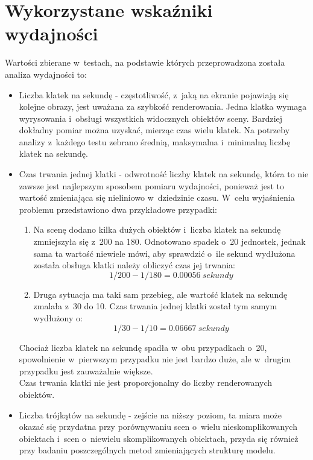 \documentclass[a4paper,twoside,12pt]{book}
\begin{document}
\section{Wykorzystane wskaźniki wydajności}
\label{section:benchamarks}
Wartości zbierane w~testach, na podstawie których przeprowadzona została analiza wydajności to:
\begin{itemize}
    \item Liczba klatek na sekundę - częstotliwość, z~jaką na ekranie pojawiają się kolejne obrazy, jest uważana za szybkość renderowania. Jedna klatka wymaga wyrysowania i~obsługi wszystkich widocznych obiektów sceny. Bardziej dokładny pomiar można uzyskać, mierząc czas wielu klatek. Na potrzeby analizy z~każdego testu zebrano średnią, maksymalna i~minimalną liczbę klatek na sekundę.
    \item Czas trwania jednej klatki - odwrotność liczby klatek na sekundę, która to nie zawsze jest najlepszym sposobem pomiaru wydajności, ponieważ jest to wartość zmieniająca się nieliniowo w~dziedzinie czasu. W~celu wyjaśnienia problemu przedstawiono dwa przykładowe przypadki:
    \begin{enumerate}[label=(\alph*)]
        \item Na scenę dodano kilka dużych obiektów i~liczba klatek na sekundę zmniejszyła się z~200 na 180. Odnotowano spadek o~20 jednostek, jednak sama ta wartość niewiele mówi, aby sprawdzić o~ile sekund wydłużona została obsługa klatki należy obliczyć czas jej trwania: \\
        \begin{equation}
            1/200 - 1/180 = 0.00056\ sekundy
        \end{equation}
        \item Druga sytuacja ma taki sam przebieg, ale wartość klatek na sekundę zmalała z~30 do 10. Czas trwania jednej klatki został tym samym wydłużony o:
        \begin{equation}
            1/30 - 1/10 = 0.06667\ sekundy
        \end{equation}
    \end{enumerate}
    Chociaż liczba klatek na sekundę spadła w~obu przypadkach o~20, spowolnienie w~pierwszym przypadku nie jest bardzo duże, ale w~drugim przypadku jest zauważalnie większe. \\
    Czas trwania klatki nie jest proporcjonalny do liczby renderowanych obiektów.
    \item Liczba trójkątów na sekundę - zejście na niższy poziom, ta miara może okazać się przydatna przy porównywaniu scen o~wielu nieskomplikowanych obiektach i~scen o~niewielu skomplikowanych obiektach, przyda się również przy badaniu poszczególnych metod zmieniających strukturę modelu.

\end{itemize}
\end{document}
